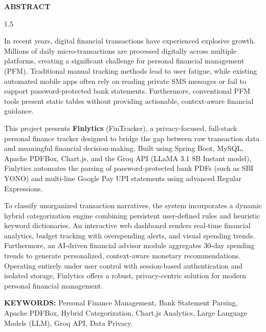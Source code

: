 \documentclass[../Project-Report-Main.tex]{subfiles}
\begin{document}
\thispagestyle{plain}

\begin{center}
\textbf{\Large ABSTRACT}
\end{center}

\vspace{0.3in}
\begin{spacing}{1.5}

\noindent In recent years, digital financial transactions have experienced explosive growth. Millions of daily micro-transactions are processed digitally across multiple platforms, creating a significant challenge for personal financial management (PFM). Traditional manual tracking methods lead to user fatigue, while existing automated mobile apps often rely on reading private SMS messages or fail to support password-protected bank statements. Furthermore, conventional PFM tools present static tables without providing actionable, context-aware financial guidance.

\noindent This project presents \textbf{Finlytics} (FinTracker), a privacy-focused, full-stack personal finance tracker designed to bridge the gap between raw transaction data and meaningful financial decision-making. Built using Spring Boot, MySQL, Apache PDFBox, Chart.js, and the Groq API (LLaMA 3.1 8B Instant model), Finlytics automates the parsing of password-protected bank PDFs (such as SBI YONO) and multi-line Google Pay UPI statements using advanced Regular Expressions.

\noindent To classify unorganized transaction narratives, the system incorporates a dynamic hybrid categorization engine combining persistent user-defined rules and heuristic keyword dictionaries. An interactive web dashboard renders real-time financial analytics, budget tracking with overspending alerts, and visual spending trends. Furthermore, an AI-driven financial advisor module aggregates 30-day spending trends to generate personalized, context-aware monetary recommendations. Operating entirely under user control with session-based authentication and isolated storage, Finlytics offers a robust, privacy-centric solution for modern personal financial management.

\vspace{0.2in}
\noindent \textbf{KEYWORDS:} Personal Finance Management, Bank Statement Parsing, Apache PDFBox, Hybrid Categorization, Chart.js Analytics, Large Language Models (LLM), Groq API, Data Privacy.

\end{spacing}
\end{document}
